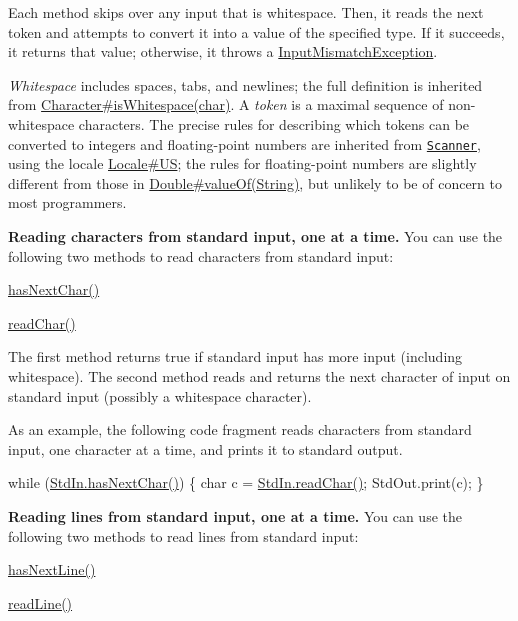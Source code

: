 Each method skips over any input that is whitespace. Then, it reads the next token and attempts to convert it into a value of the specified type. If it succeeds, it returns that value; otherwise, it throws a \hyperlink{}{Input\+Mismatch\+Exception}. 

{\itshape Whitespace} includes spaces, tabs, and newlines; the full definition is inherited from \hyperlink{}{Character\#is\+Whitespace(char)}. A {\itshape token} is a maximal sequence of non-\/whitespace characters. The precise rules for describing which tokens can be converted to integers and floating-\/point numbers are inherited from \href{http://docs.oracle.com/javase/7/docs/api/java/util/Scanner.html#number-syntax}{\tt Scanner}, using the locale \hyperlink{}{Locale\#\+US}; the rules for floating-\/point numbers are slightly different from those in \hyperlink{}{Double\#value\+Of(\+String)}, but unlikely to be of concern to most programmers. 

{\bfseries Reading characters from standard input, one at a time.} You can use the following two methods to read characters from standard input\+: 
\begin{DoxyItemize}
\item \hyperlink{classcom_1_1mycompany_1_1myfirstmapboxapp_1_1_std_in_ab46430a80e71ad8adc86ac0c068c20be}{has\+Next\+Char()} 
\item \hyperlink{classcom_1_1mycompany_1_1myfirstmapboxapp_1_1_std_in_ab6468a980b4dba835a5168734d16ef31}{read\+Char()} 
\end{DoxyItemize}

The first method returns true if standard input has more input (including whitespace). The second method reads and returns the next character of input on standard input (possibly a whitespace character). 

As an example, the following code fragment reads characters from standard input, one character at a time, and prints it to standard output. 
\begin{DoxyPre}
while (\hyperlink{classcom_1_1mycompany_1_1myfirstmapboxapp_1_1_std_in_ab46430a80e71ad8adc86ac0c068c20be}{StdIn.hasNextChar()}) \{
    char c = \hyperlink{classcom_1_1mycompany_1_1myfirstmapboxapp_1_1_std_in_ab6468a980b4dba835a5168734d16ef31}{StdIn.readChar()};
    StdOut.print(c);
\}
\end{DoxyPre}
 

{\bfseries Reading lines from standard input, one at a time.} You can use the following two methods to read lines from standard input\+: 
\begin{DoxyItemize}
\item \hyperlink{classcom_1_1mycompany_1_1myfirstmapboxapp_1_1_std_in_ace5ddf1a9d8a3aacb85be47296327502}{has\+Next\+Line()} 
\item \hyperlink{classcom_1_1mycompany_1_1myfirstmapboxapp_1_1_std_in_a0ce2aa1a4c057b28a34bd07c54c45545}{read\+Line()} 
\end{DoxyItemize}

